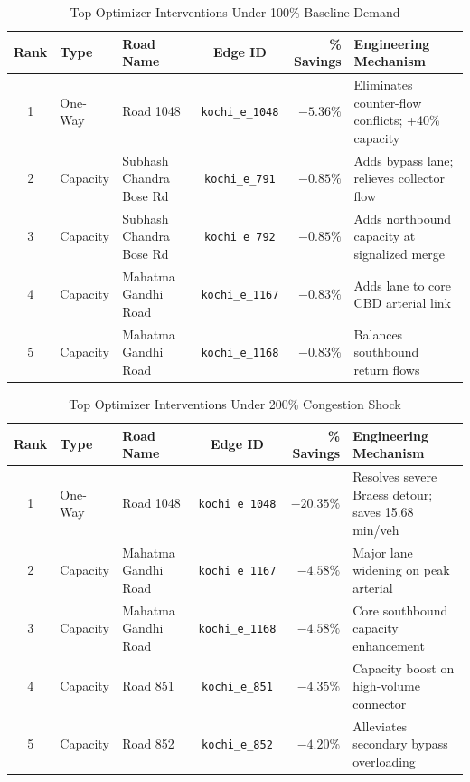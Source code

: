 \documentclass[12pt,a4paper]{report}
\begin{document}
\begin{table}[H]
\centering
\caption{Top Optimizer Interventions Under 100\% Baseline Demand}
\label{tab:recs_100}
\vspace{0.15cm}
\footnotesize
\setlength{\tabcolsep}{3pt}
\begin{tabularx}{\textwidth}{clp{3.2cm}cr>{\raggedright\arraybackslash}X}
\toprule
\textbf{Rank} & \textbf{Type} & \textbf{Road Name} & \textbf{Edge ID} & \textbf{\% Savings} & \textbf{Engineering Mechanism} \\
\midrule
1 & One-Way & Road 1048 & \texttt{kochi\_e\_1048} & $-5.36\%$ & Eliminates counter-flow conflicts; +40\% capacity \\
2 & Capacity & Subhash Chandra Bose Rd & \texttt{kochi\_e\_791} & $-0.85\%$ & Adds bypass lane; relieves collector flow \\
3 & Capacity & Subhash Chandra Bose Rd & \texttt{kochi\_e\_792} & $-0.85\%$ & Adds northbound capacity at signalized merge \\
4 & Capacity & Mahatma Gandhi Road & \texttt{kochi\_e\_1167} & $-0.83\%$ & Adds lane to core CBD arterial link \\
5 & Capacity & Mahatma Gandhi Road & \texttt{kochi\_e\_1168} & $-0.83\%$ & Balances southbound return flows \\
\bottomrule
\end{tabularx}
\end{table}

\begin{table}[H]
\centering
\caption{Top Optimizer Interventions Under 200\% Congestion Shock}
\label{tab:recs_200}
\vspace{0.15cm}
\footnotesize
\setlength{\tabcolsep}{3pt}
\begin{tabularx}{\textwidth}{clp{3.2cm}cr>{\raggedright\arraybackslash}X}
\toprule
\textbf{Rank} & \textbf{Type} & \textbf{Road Name} & \textbf{Edge ID} & \textbf{\% Savings} & \textbf{Engineering Mechanism} \\
\midrule
1 & One-Way & Road 1048 & \texttt{kochi\_e\_1048} & \textbf{$-20.35\%$} & Resolves severe Braess detour; saves 15.68 min/veh \\
2 & Capacity & Mahatma Gandhi Road & \texttt{kochi\_e\_1167} & $-4.58\%$ & Major lane widening on peak arterial \\
3 & Capacity & Mahatma Gandhi Road & \texttt{kochi\_e\_1168} & $-4.58\%$ & Core southbound capacity enhancement \\
4 & Capacity & Road 851 & \texttt{kochi\_e\_851} & $-4.35\%$ & Capacity boost on high-volume connector \\
5 & Capacity & Road 852 & \texttt{kochi\_e\_852} & $-4.20\%$ & Alleviates secondary bypass overloading \\
\bottomrule
\end{tabularx}
\end{table}
\end{document}
